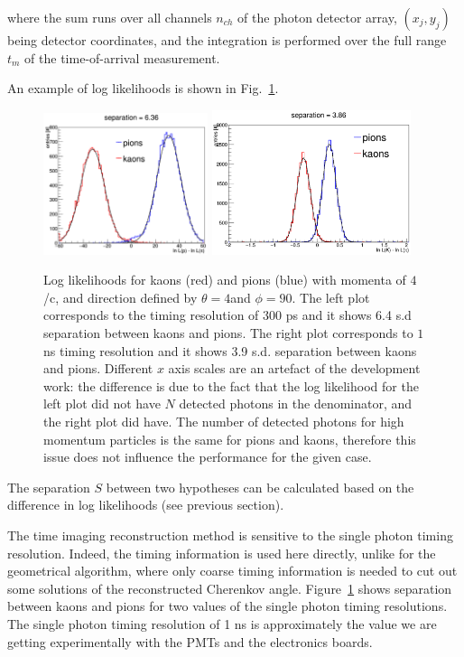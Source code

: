 \noindent where the sum runs over all channels $n_{ch}$ of the photon detector array, $(x_{j}, y_{j})$ being detector coordinates, and the integration is performed over the full range $t_{m}$ of the time-of-arrival measurement.

An example of log likelihoods is shown in Fig.~\ref{pic:sepTI}.

\begin{figure}[!h]
\centering
\includegraphics[width=0.43\textwidth]{pics/sepTI300.png} \hspace{0.5cm} \includegraphics[width=0.52\textwidth]{pics/sepTI1000.png}
\caption{\label{pic:sepTI}
Log likelihoods for kaons (red) and pions (blue) with momenta of $4$ {\gev}/c, and direction defined by $\theta = 4$\mydeg and $\phi = 90$\mydeg. The left plot corresponds to the timing resolution of $300$ ps and it shows 6.4 s.d separation between kaons and pions. The right plot corresponds to $1$ ns timing resolution and it shows 3.9 s.d. separation between kaons and pions. \newline \footnotesize{Different $x$ axis scales are an artefact of the development work: the difference is due to the fact that the log likelihood for the left plot did not have $N$ detected photons in the denominator, and the right plot did have. The number of detected photons for high momentum particles is the same for pions and kaons, therefore this issue does not influence the performance for the given case. }
}
\end{figure}

The separation $S$ between two hypotheses can be calculated based on the difference in log likelihoods (see previous section).

The time imaging reconstruction method is sensitive to the single photon timing resolution. Indeed, the timing information is used here directly, unlike for the geometrical algorithm, where only coarse timing information is needed to cut out some solutions of the reconstructed Cherenkov angle. Figure~\ref{pic:sepTI} shows separation between kaons and pions for two values of the single photon timing resolutions. The single photon timing resolution of 1 ns is approximately the value we are getting experimentally with the PMTs and the electronics boards.
